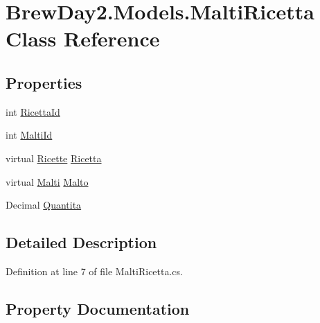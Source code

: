 \hypertarget{class_brew_day2_1_1_models_1_1_malti_ricetta}{}\section{Brew\+Day2.\+Models.\+Malti\+Ricetta Class Reference}
\label{class_brew_day2_1_1_models_1_1_malti_ricetta}
\subsection*{Properties}
\begin{DoxyCompactItemize}
\item 
int \mbox{\hyperlink{class_brew_day2_1_1_models_1_1_malti_ricetta_a8e2e50c84d47cd087ceefe9906414128}{Ricetta\+Id}}
\item 
int \mbox{\hyperlink{class_brew_day2_1_1_models_1_1_malti_ricetta_ac0163620cb0dbbfa83669c44d8ee7e5b}{Malti\+Id}}
\item 
virtual \mbox{\hyperlink{class_brew_day2_1_1_models_1_1_ricette}{Ricette}} \mbox{\hyperlink{class_brew_day2_1_1_models_1_1_malti_ricetta_a73234aded9e6b186f28f4fa523994036}{Ricetta}}
\item 
virtual \mbox{\hyperlink{class_brew_day2_1_1_models_1_1_malti}{Malti}} \mbox{\hyperlink{class_brew_day2_1_1_models_1_1_malti_ricetta_adf6d33b81779dc74a3c2b48ad28e7b28}{Malto}}
\item 
Decimal \mbox{\hyperlink{class_brew_day2_1_1_models_1_1_malti_ricetta_a6461e3234e339fe5955f998aeebf1e8d}{Quantita}}
\end{DoxyCompactItemize}


\subsection{Detailed Description}


Definition at line 7 of file Malti\+Ricetta.\+cs.



\subsection{Property Documentation}
\mbox{\label{class_brew_day2_1_1_models_1_1_malti_ricetta_ac0163620cb0dbbfa83669c44d8ee7e5b}} 
